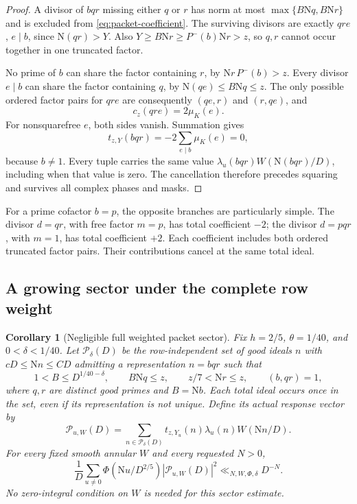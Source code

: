 \documentclass[11pt]{article}
\numberwithin{equation}{section}
\newtheorem{corollary}[theorem]{Corollary}
\theoremstyle{definition}
\theoremstyle{remark}
\newcommand{\N}{\mathrm N}
\newcommand{\muK}{\mu_K}
\begin{document}
\begin{proof}
A divisor of $bqr$ missing either $q$ or $r$ has norm at most
$\max\{B\N q,B\N r\}$ and is excluded from
\eqref{eq:packet-coefficient}. The surviving divisors are exactly
$qre$, $e\mid b$, since $\N(qr)>Y$.
Also $Y\ge B\N r\ge P^-(b)\N r>z$, so $q,r$ cannot occur
together in one truncated factor.

No prime of $b$ can share the factor containing $r$, by
$\N r\,P^-(b)>z$. Every divisor $e\mid b$ can share the
factor containing $q$, by $\N(qe)\le B\N q\le z$.
The only possible ordered factor pairs for $qre$ are consequently
$(qe,r)$ and $(r,qe)$, and
\[
 c_z(qre)=2\muK(e).
\]
For nonsquarefree $e$, both sides vanish. Summation gives
\[
 t_{z,Y}(bqr)=-2\sum_{e\mid b}\muK(e)=0,
\]
because $b\ne1$. Every tuple carries the same value
$\lambda_u(bqr)W(\N(bqr)/D)$, including when that value is zero.
The cancellation therefore precedes squaring and survives all
complex phases and masks.
\end{proof}

For a prime cofactor $b=p$, the opposite branches are particularly
simple. The divisor $d=qr$, with free factor $m=p$, has total
coefficient $-2$; the divisor $d=pqr$, with $m=1$, has total
coefficient $+2$. Each coefficient includes both ordered truncated
factor pairs. Their contributions cancel at the same total ideal.

\subsection{A growing sector under the complete row weight}

\begin{corollary}[Negligible full weighted packet sector]
\label{cor:packet-energy}
Fix $h=2/5$, $\theta=1/40$, and $0<\delta<1/40$.
Let $\mathcal P_\delta(D)$ be the row-independent set of good ideals
$n$ with $cD\le\N n\le CD$ admitting a representation $n=bqr$
such that
\begin{equation}\label{eq:packet-growing-set}
 1<B\le D^{1/40-\delta},\qquad B\N q\le z,
 \qquad z/7<\N r\le z,
 \qquad (b,qr)=1,
\end{equation}
where $q,r$ are distinct good primes and $B=\N b$.
Each total ideal occurs once in the set, even if its representation
is not unique. Define its actual response vector by
\begin{equation}\label{eq:packet-response}
 \mathcal P_{u,W}(D)=
 \sum_{n\in\mathcal P_\delta(D)}
 t_{z,Y_u}(n)\lambda_u(n)W(\N n/D).
\end{equation}
For every fixed smooth annular $W$ and every requested $N>0$,
\begin{equation}\label{eq:packet-energy}
 \frac1D\sum_{u\ne0}\Phi(\N u/D^{2/5})
       |\mathcal P_{u,W}(D)|^2\ll_{N,W,\Phi,\delta}D^{-N}.
\end{equation}
No zero-integral condition on $W$ is needed for this sector estimate.
\end{corollary}
\end{document}
